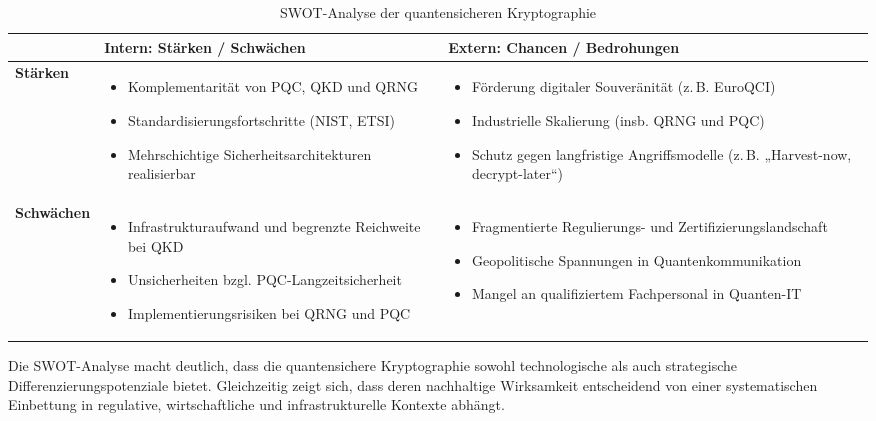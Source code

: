 \begin{table}[htbp]
\centering
\caption{SWOT-Analyse der quantensicheren Kryptographie}
\label{tab:swot}
\begin{tabular}{@{}p{4.2cm}p{5.6cm}p{5.6cm}@{}}
\toprule
\textbf{} & \textbf{Intern: Stärken / Schwächen} & \textbf{Extern: Chancen / Bedrohungen} \\
\midrule
\textbf{Stärken} &
\begin{itemize}
  \item Komplementarität von PQC, QKD und QRNG
  \item Standardisierungsfortschritte (NIST, ETSI)
  \item Mehrschichtige Sicherheitsarchitekturen realisierbar
\end{itemize}
&
\begin{itemize}
  \item Förderung digitaler Souveränität (z.\,B. EuroQCI)
  \item Industrielle Skalierung (insb. QRNG und PQC)
  \item Schutz gegen langfristige Angriffsmodelle (z.\,B. „Harvest-now, decrypt-later“)
\end{itemize}
\\
\textbf{Schwächen} &
\begin{itemize}
  \item Infrastrukturaufwand und begrenzte Reichweite bei QKD
  \item Unsicherheiten bzgl. PQC-Langzeitsicherheit
  \item Implementierungsrisiken bei QRNG und PQC
\end{itemize}
&
\begin{itemize}
  \item Fragmentierte Regulierungs- und Zertifizierungslandschaft
  \item Geopolitische Spannungen in Quantenkommunikation
  \item Mangel an qualifiziertem Fachpersonal in Quanten-IT
\end{itemize}
\\
\bottomrule
\end{tabular}
\end{table}

Die SWOT-Analyse macht deutlich, dass die quantensichere Kryptographie sowohl technologische als auch strategische Differenzierungspotenziale bietet. Gleichzeitig zeigt sich, dass deren nachhaltige Wirksamkeit entscheidend von einer systematischen Einbettung in regulative, wirtschaftliche und infrastrukturelle Kontexte abhängt.

